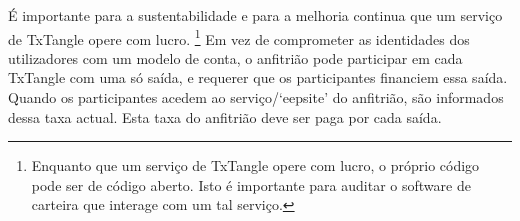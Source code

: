 \label{subsec:txtangle-host-service}

É importante para a sustentabilidade e para a melhoria continua que um serviço de TxTangle opere com lucro. 
\footnote{Enquanto que um serviço de TxTangle opere com lucro, o próprio código pode ser de código aberto. Isto é importante para auditar o software de carteira que interage com um tal serviço.} 
Em vez de comprometer as identidades dos utilizadores com um modelo de conta, o anfitrião pode participar em cada TxTangle com uma só saída, e requerer que os participantes financiem essa saída. Quando os participantes acedem ao serviço/`eepsite' do anfitrião, são informados dessa taxa actual. Esta taxa do anfitrião deve ser paga por cada saída.   


